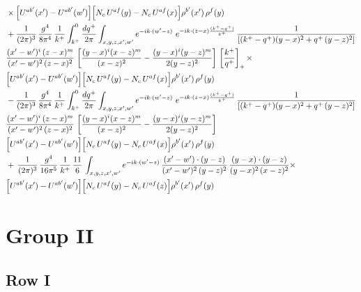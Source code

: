 \documentclass[9pt]{article}
\numberwithin{equation}{section}
\begin{document}
\begin{align}
&\times\Big[U^{ab'}(x')-U^{ab'}(w')\Big]\Big[N_{c}\,U^{af}(y)-N_{c}\,U^{af}(x)\Big]\rho^{b'}(x')\,\rho^{f}(y)\notag \\ & + \frac{1}{(2\pi)^{3}}\,\frac{g^{4}}{8\pi^{4}}\,\frac{1}{k^{+}}\int_{k^{+}}^{0}\frac{dq^{+}}{2\pi}\int_{x,y,z,x',w'}e^{-ik\cdot(w'-z)}\ e^{-ik\cdot(z-x)\frac{(k^{+}-q^{+})}{k^{+}}}\,\frac{1}{\left[(k^{+}-q^{+})(y-x)^{2}+q^{+}\,(y-z)^{2}\right]}\notag \\ & \frac{(x'-w')^{i}\,(z-x)^{m}}{(x'-w')^{2}\,(z-x)^{2}}\,\left[\frac{(y-x)^{i}(x-z)^{m}}{(x-z)^{2}}-\frac{(y-x)^{i}(y-z)^{m}}{2(y-z)^{2}}\right]\,\left[\frac{k^{+}}{q^{+}}\right]_{+}\times\notag \\ & \Big[U^{ab'}(x')-U^{ab'}(w')\Big]\Big[N_{c}\,U^{af}(y)-N_{c}\,U^{af}(x)\Big]\rho^{b'}(x')\,\rho^{f}(y)\notag \\ & - \frac{1}{(2\pi)^{3}}\,\frac{g^{4}}{8\pi^{4}}\,\frac{1}{k^{+}}\int_{k^{+}}^{0}\frac{dq^{+}}{2\pi}\int_{x,y,z,x',w'}e^{-ik\cdot(w'-z)}\ e^{-ik\cdot(z-x)\frac{(k^{+}-q^{+})}{k^{+}}}\,\frac{1}{\left[(k^{+}-q^{+})(y-x)^{2}+q^{+}\,(y-z)^{2}\right]}\notag \\ & \frac{(x'-w')^{i}\,(z-x)^{m}}{(x'-w')^{2}\,(z-x)^{2}}\,\left[\frac{(y-x)^{i}(x-z)^{m}}{(x-z)^{2}}-\frac{(y-x)^{i}(y-z)^{m}}{2(y-z)^{2}}\right]\notag \\ & \Big[U^{ab'}(x')-U^{ab'}(w')\Big]\Big[N_{c}\,U^{af}(y)-N_{c}\,U^{af}(x)\Big]\rho^{b'}(x')\,\rho^{f}(y)\notag \\ & +\, \frac{1}{(2\pi)^{3}}\,\frac{g^{4}}{16\pi^{5}}\,\frac{1}{k^{+}}\,\frac{11}{6}\,\int_{x,y,z,x',w'}e^{-ik\cdot(w'-z)}\, \frac{(x'-w')\cdot(y-z)}{(x'-w')^{2}\,(y-z)^{2}}\,\frac{(y-x)\cdot(y-z)}{(y-x)^{2}\,(x-z)^{2}}\times\notag \\ & \Big[U^{ab'}(x')-U^{ab'}(w')\Big]\Big[N_{c}\,U^{af}(y)-N_{c}\,U^{af}(z)\Big]\rho^{b'}(x')\,\rho^{f}(y)
\end{align}
\section{Group II}
\subsection{Row I}
\end{document}
